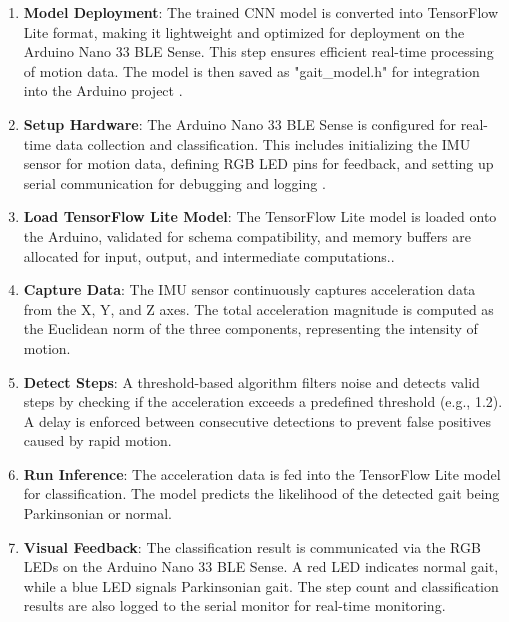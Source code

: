 \begin{enumerate}
    \item \textbf{Model Deployment}: The trained CNN model is converted into TensorFlow Lite format, making it lightweight and optimized for deployment on the Arduino Nano 33 BLE Sense. This step ensures efficient real-time processing of motion data. The model is then saved as "gait\_model.h" for integration into the Arduino project \cite{Sulaimon:2021}.
    
    \item \textbf{Setup Hardware}: The Arduino Nano 33 BLE Sense is configured for real-time data collection and classification. This includes initializing the IMU sensor for motion data, defining RGB LED pins for feedback, and setting up serial communication for debugging and logging \cite{ArduinoNano33Sense2025}.
    
    \item \textbf{Load TensorFlow Lite Model}: The TensorFlow Lite model is loaded onto the Arduino, validated for schema compatibility, and memory buffers are allocated for input, output, and intermediate computations.\cite{David:2021}.
    
    \item \textbf{Capture Data}: The IMU sensor continuously captures acceleration data from the X, Y, and Z axes. The total acceleration magnitude is computed as the Euclidean norm of the three components, representing the intensity of motion\cite{Panebianco:2018}.
    
    \item \textbf{Detect Steps}: A threshold-based algorithm filters noise and detects valid steps by checking if the acceleration exceeds a predefined threshold (e.g., 1.2). A delay is enforced between consecutive detections to prevent false positives caused by rapid motion\cite{Panebianco:2018}.
    
    \item \textbf{Run Inference}: The acceleration data is fed into the TensorFlow Lite model for classification. The model predicts the likelihood of the detected gait being Parkinsonian or normal\cite{Viswanatha:2022}.
    
    \item \textbf{Visual Feedback}: The classification result is communicated via the RGB LEDs on the Arduino Nano 33 BLE Sense. A red LED indicates normal gait, while a blue LED signals Parkinsonian gait. The step count and classification results are also logged to the serial monitor for real-time monitoring\cite{ArduinoNano33Sense2025}.
\end{enumerate}


